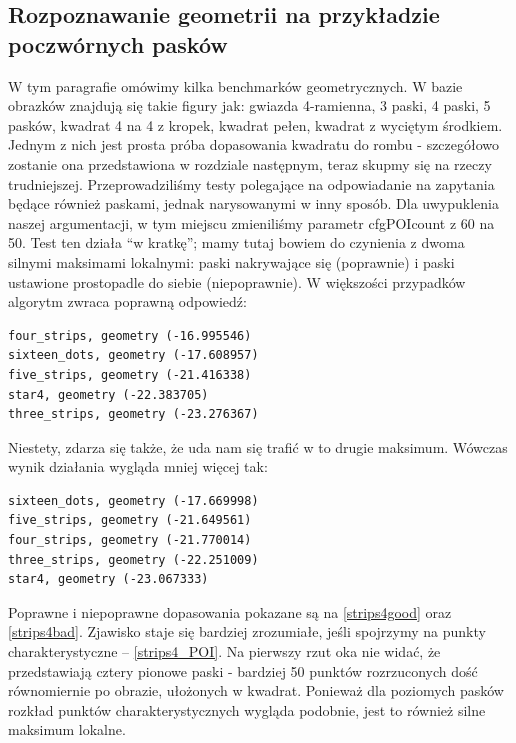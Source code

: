 \documentclass[a4paper,12pt,leqno]{article}
\begin{document}
\subsection{Rozpoznawanie geometrii na przykładzie poczwórnych pasków}
W tym paragrafie omówimy kilka benchmarków geometrycznych.
W bazie obrazków znajdują się takie figury jak: gwiazda 4-ramienna, 3 paski, 4 paski, 5 pasków, kwadrat 4 na 4 z kropek, kwadrat pełen, kwadrat z wyciętym środkiem.
Jednym z nich jest prosta próba dopasowania kwadratu do rombu - szczegółowo zostanie ona przedstawiona w rozdziale następnym, teraz skupmy się na rzeczy trudniejszej.
Przeprowadziliśmy testy polegające na odpowiadanie na zapytania będące również paskami, jednak narysowanymi w inny sposób.
Dla uwypuklenia naszej argumentacji, w tym miejscu zmieniliśmy parametr cfgPOIcount z 60 na 50.
Test ten działa ``w kratkę''; mamy tutaj bowiem do czynienia z dwoma silnymi maksimami lokalnymi: paski nakrywające się (poprawnie) i paski ustawione prostopadle do siebie (niepoprawnie).
W większości przypadków algorytm zwraca poprawną odpowiedź:
\begin{verbatim}
four_strips, geometry (-16.995546)
sixteen_dots, geometry (-17.608957)
five_strips, geometry (-21.416338)
star4, geometry (-22.383705)
three_strips, geometry (-23.276367)
\end{verbatim}

Niestety, zdarza się także, że uda nam się trafić w to drugie maksimum. Wówczas wynik działania wygląda mniej więcej tak:
\begin{verbatim}
sixteen_dots, geometry (-17.669998)
five_strips, geometry (-21.649561)
four_strips, geometry (-21.770014)
three_strips, geometry (-22.251009)
star4, geometry (-23.067333)
\end{verbatim}
Poprawne i niepoprawne dopasowania pokazane są na \ref{strips4good} oraz \ref{strips4bad}. Zjawisko staje się bardziej zrozumiałe, jeśli spojrzymy na punkty charakterystyczne --
\ref{strips4_POI}. Na pierwszy rzut oka nie widać, że przedstawiają cztery pionowe paski - bardziej 50 punktów rozrzuconych dość równomiernie po obrazie, ułożonych w kwadrat.
Ponieważ dla poziomych pasków rozkład punktów charakterystycznych wygląda podobnie, jest to również silne maksimum lokalne.
\end{document}

